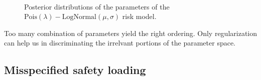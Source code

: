 \documentclass[10pt]{article}
\begin{document}
\begin{figure}[!ht]
  \begin{center}
    \\
    \caption{Posterior distributions of the parameters of the $\text{Pois}(\lambda)-\text{LogNormal}(\mu , \sigma)$ risk model.}
    \label{fig:posterior_commercial_premium_wo_reg}
  \end{center}
\end{figure}

Too many combination of parameters yield the right ordering. Only regularization can help us in discriminating the irrelvant portions of the parameter space.

\subsection{Misspecified safety loading} \label{ssec:miss_specfifed_safety_loading}



\end{document}
